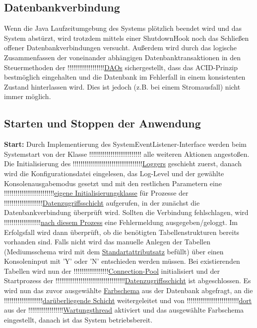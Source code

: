 \documentclass{article}
\begin{document}
\subsection{Datenbankverbindung}
Wenn die Java Laufzeitumgebung des Systems plötzlich beendet wird und das System abstürzt, wird trotzdem mittels einer ShutdownHook noch das Schließen offener Datenbankverbindungen versucht. Außerdem wird durch das logische Zusammenfassen der voneinander abhängigen Datenbanktransaktionen in den Steuermethoden der !!!!!!!!!!!!!!!!!!!\hyperlink{}{DAOs} sichergestellt, dass das ACID-Prinzip bestmöglich eingehalten und die Datenbank im Fehlerfall in einem konsistenten Zustand hinterlassen wird. Dies ist jedoch (z.B. bei einem Stromausfall) nicht immer möglich.
\subsection{Starten und Stoppen der Anwendung}
\noindent \textbf{Start:} Durch Implementierung des SystemEventListener-Interface werden beim Systemstart von der Klasse !!!!!!!!!!!!!!!!!!!!!!!!!!!\hyperlink{}{} alle weiteren Aktionen angestoßen. Die Initialisierung des !!!!!!!!!!!!!!!!!!!!!!!!!!!!!!!!!!!!\hyperlink{}{Loggers} geschieht zuerst, danach wird die Konfigurationsdatei eingelesen, das Log-Level und der gewählte Konsolenausgabemodus gesetzt und mit den restlichen Parametern eine !!!!!!!!!!!!!!!!!!!!!!!!!!\hyperlink{}{eigene Initialisierungsklasse} für Prozesse der !!!!!!!!!!!!!!!!!!!!\hyperlink{}{Datenzugriffsschicht} aufgerufen, in der zunächst die Datenbankverbindung überprüft wird. Sollten die Verbindung fehlschlagen, wird !!!!!!!!!!!!!!!!!!!\hyperlink{}{nach diesem Prozess} eine Fehlermeldung ausgegeben/geloggt. Im Erfolgsfall wird dann überprüft, ob die benötigten Tabellenstrukturen bereits vorhanden sind. Falls nicht wird das manuelle Anlegen der Tabellen (Mediumsschema wird mit dem \hyperlink{Standartattributsatz}{Standartattributsatz} befüllt) über einen Konsoleninput mit 'Y' oder 'N' entschieden werden müssen. Bei existierenden Tabellen wird  nun der !!!!!!!!!!!!!!!!!!\hyperlink{}{Connection-Pool} initialisiert und der Startprozess der !!!!!!!!!!!!!!!!!!!!!!!!!!!!!!!!!!!!\hyperlink{}{Datenzugriffsschicht} ist abgeschlossen. Es wird nun das zuvor ausgewählte \hyperlink{Farbschemaattribut}{Farbschema} aus der Datenbank abgefragt, an die !!!!!!!!!!!!!!!!!!!!\hyperlink{}{darüberliegende Schicht} weitergeleitet und von !!!!!!!!!!!!!!!!!!!!!!!!!!!\hyperlink{}{dort} aus der !!!!!!!!!!!!!!!!!!\hyperlink{}{Wartungsthread} aktiviert und das ausgewählte Farbschema eingestellt, danach ist das System betriebsbereit. \\
\end{document}
